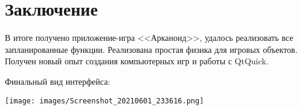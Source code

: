 \documentclass[a4paper,12pt]{article}
\begin{document}


\newpage
\section*{Заключение}
В итоге получено приложение-игра <<Арканоид>>, удалось реализовать все запланированные функции. Реализована простая физика для игровых объектов. Получен новый опыт создания компьютерных игр и работы с QtQuick.

Финальный вид интерфейса:
\begin{center}
    \texttt{[image: images/Screenshot\_20210601\_233616.png]}
\end{center}



\newpage
\appendix

\end{document}
